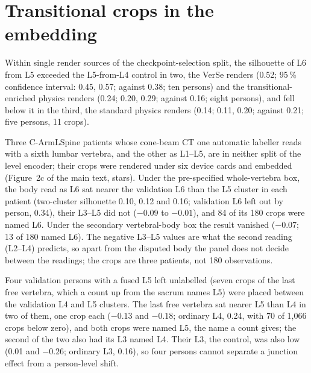 \section*{Transitional crops in the embedding}
Within single render sources of the checkpoint-selection split, the silhouette of L6 from L5 exceeded the L5-from-L4
control in two, the VerSe renders (0.52; 95\,\% confidence interval: 0.45, 0.57; against 0.38; ten persons) and the
transitional-enriched physics renders (0.24; 0.20, 0.29; against 0.16; eight persons), and fell below it in the third,
the standard physics renders (0.14; 0.11, 0.20; against 0.21; five persons, 11 crops).

Three C-ArmLSpine patients whose cone-beam CT one automatic labeller reads with a sixth lumbar vertebra, and the other
as L1--L5, are in neither split of the level encoder; their crops were rendered under six device cards and embedded
(Figure~2c of the main text, stars). Under the pre-specified whole-vertebra box, the body read as L6 sat nearer the
validation L6 than the L5 cluster in each patient (two-cluster silhouette 0.10, 0.12 and 0.16; validation L6 left out
by person, 0.34), their L3--L5 did not ($-0.09$ to $-0.01$), and 84 of its 180 crops were named L6. Under the secondary
vertebral-body box the result vanished ($-0.07$; 13 of 180 named L6). The negative L3--L5 values are what the second
reading (L2--L4) predicts, so apart from the disputed body the panel does not decide between the readings; the crops
are three patients, not 180 observations.

Four validation persons with a fused L5 left unlabelled (seven crops of the last free vertebra, which a count up from
the sacrum names L5) were placed between the validation L4 and L5 clusters. The last free vertebra sat nearer L5 than
L4 in two of them, one crop each ($-0.13$ and $-0.18$; ordinary L4, 0.24, with 70 of 1,066 crops below zero), and
both crops were named L5, the name a count gives; the second of the two also had its L3 named L4. Their L3, the
control, was also low (0.01 and $-0.26$; ordinary L3, 0.16), so four persons cannot separate a junction effect from a
person-level shift.

